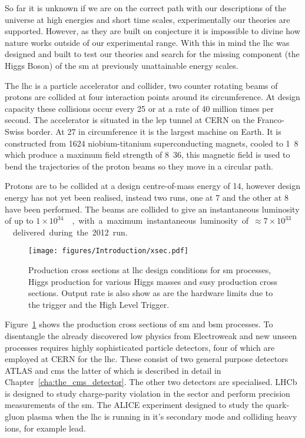 So far it is unknown if we are on the correct path with our descriptions of 
the universe at high energies and short time scales, experimentally our 
theories are supported. However, as they are built on conjecture it is impossible to divine how nature works outside of our experimental range.
With this in mind the \ac{lhc} was designed and built to test our theories and 
search for the missing component (the Higgs Boson) of the \ac{sm} at previously 
unattainable energy scales.

The \ac{lhc} is a particle accelerator and collider, two counter 
rotating beams of protons are collided at four interaction points around its 
circumference. At design capacity these collisions occur every 
\unit{25}{\nano\second} or at a rate of 40 million times per second.
The accelerator is situated in the \ac{lep} tunnel at CERN on the 
Franco-Swiss border. At \unit{27}{\kilo\meter} in circumference it is the 
largest machine on Earth. It is constructed from 1624 niobium-titanium 
superconducting magnets, cooled to \unit{1.8}{\kelvin} which produce a maximum 
field strength of \unit{8.36}{\tesla}, this magnetic field is used to bend the 
trajectories of the proton beams so they move in a circular path.

Protons are to be collided at a design centre-of-mass energy of 
\unit{14}{\TeV}, however design energy has not yet been realised, instead two 
runs, one at \unit{7}{\TeV} and the other at \unit{8}{\TeV} have been 
performed. The beams are collided to give an instantaneous luminosity of up to 
\unit{$1\times10^{34}$}{\lumiunits}, with a maximum instantaneous luminosity of 
\unit{$\approx 7 \times 10^{33}$}{\lumiunits} delivered during the 2012 run.



\begin{figure}[ht]
  \centering
    \texttt{[image: figures/Introduction/xsec.pdf]}
  \caption{Production cross sections at \ac{lhc} design conditions for \ac{sm} processes, Higgs production for various Higgs masses and \ac{susy} production cross sections. Output rate is also show as are the hardware limits due to the \Lone trigger and the High Level Trigger\cite{productionxsecs}.}
  \label{fig:figures_Introduction_xsec}
\end{figure}

Figure~\ref{fig:figures_Introduction_xsec} shows the production cross sections 
of \ac{sm} and \ac{bsm} processes. To disentangle the already discovered 
low \pt physics from Electroweak and new unseen processes requires 
highly sophisticated particle detectors, four of which are employed at CERN for 
the \ac{lhc}. These consist of two general purpose detectors 
ATLAS\cite{ref:atlas} and \ac{cms}\cite{ref:cms} the latter of which is 
described in detail in Chapter~\ref{cha:the_cms_detector}. The other two 
detectors are specialised. LHCb\cite{ref:lhcb} is designed to study 
charge-parity violation in the \Pbottom sector and perform precision 
measurements of the \ac{sm}. The ALICE\cite{ref:alice} experiment designed to 
study the quark-gluon plasma when the \ac{lhc} is running in it's secondary 
mode and colliding heavy ions, for example lead.


